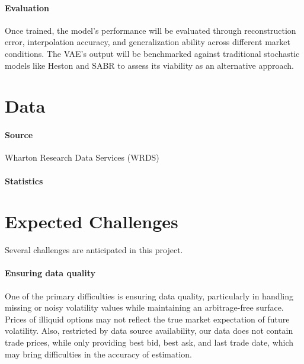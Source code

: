 \documentclass{article}
\newcommand{\todo}[1]{\fbox{\textcolor{red}{\bfseries #1} }}%
\begin{document}
\paragraph{Evaluation} Once trained, the model’s performance will be evaluated through reconstruction error, interpolation accuracy, and generalization ability across different market conditions. The VAE’s output will be benchmarked against traditional stochastic models like Heston \cite{wolfram_volsurface_heston} and SABR \cite{wolfram_volsurface_sabr} to assess its viability as an alternative approach.

\section{Data}
\paragraph{Source} Wharton Research Data Services (WRDS) \todo{Detailed description}
\paragraph{Statistics}  \todo{Add statistics here}




\section{Expected Challenges}

Several challenges are anticipated in this project. 
\paragraph{Ensuring data quality}
One of the primary difficulties is ensuring data quality, particularly in handling missing or noisy volatility values while maintaining an arbitrage-free surface. Prices of illiquid options may not reflect the true market expectation of future volatility. Also, restricted by data source availability, our data does not contain trade prices, while only providing best bid, best ask, and last trade date, which may bring difficulties in the accuracy of estimation. 
\end{document}
